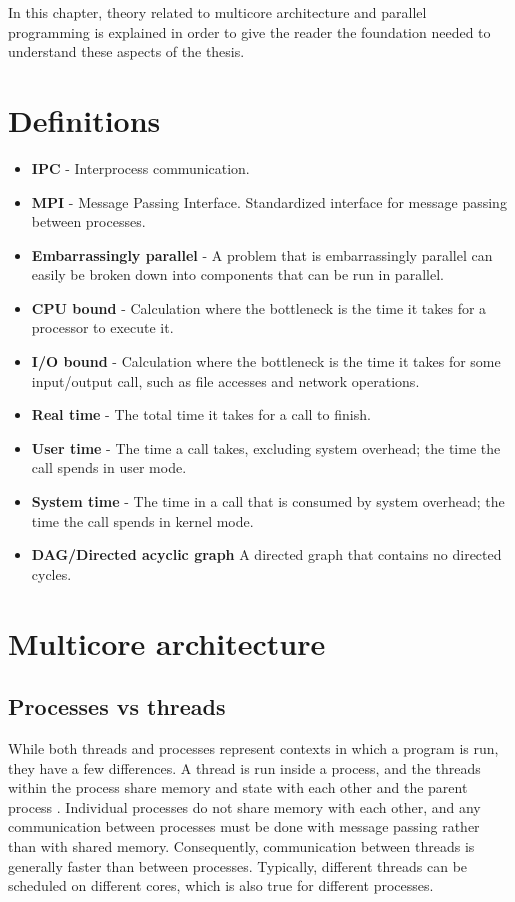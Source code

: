 In this chapter, theory related to multicore architecture and parallel programming is
explained in order to give the reader the foundation needed to understand these aspects of
the thesis.

\section{Definitions}
\begin{itemize}
  \item \textbf{IPC} - Interprocess communication.
  \item \textbf{MPI} - Message Passing Interface. Standardized interface for message passing between processes.
  \item \textbf{Embarrassingly parallel} - A problem that is embarrassingly parallel can easily be broken down into components that
    can be run in parallel. %
  \item \textbf{CPU bound} - Calculation where the bottleneck is the time it takes for a processor to execute it.
  \item \textbf{I/O bound} - Calculation where the bottleneck is the time it takes for some input/output call, such as file accesses
    and network operations.
  \item \textbf{Real time} - The total time it takes for a call to finish.
  \item \textbf{User time} - The time a call takes, excluding system overhead; the time the call spends in user mode.
  \item \textbf{System time} - The time in a call that is consumed by system overhead; the time the call spends in kernel mode.
  \item \textbf{DAG/Directed acyclic graph} A directed graph that contains no directed cycles.
\end{itemize}

\section{Multicore architecture}
\subsection{Processes vs threads}
While both threads and processes represent contexts in which a program is run, they have a few differences. A thread is run inside
a process, and the threads within the process share memory and state with each other and the parent
process \cite{singh_2013_parallel_padpwprfmm}. Individual processes do not share memory with each other, and any
communication between processes must be done with message passing rather than with shared memory. Consequently, communication
between threads is generally faster than between processes.
Typically, different threads can be scheduled on different cores, which is also true for different processes.

